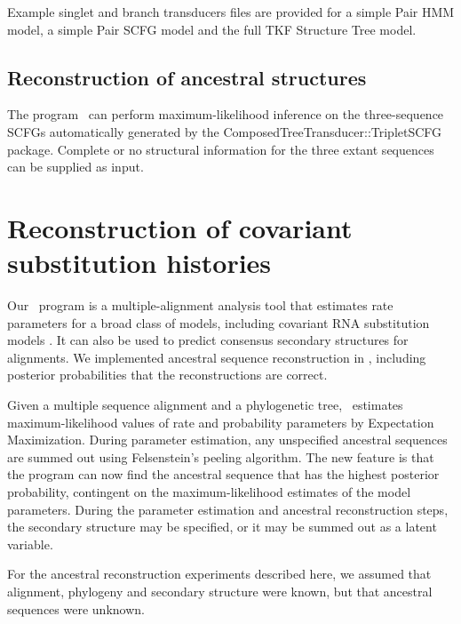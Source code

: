 \documentclass[10pt]{article}
\begin{document}
Example singlet and branch transducers files are provided for a simple 
Pair HMM model, a simple Pair SCFG model and the full TKF Structure Tree model.

\subsection{Reconstruction of ancestral structures}
The program \indiegram\ can perform maximum-likelihood inference on the
three-sequence SCFGs automatically generated by the ComposedTreeTransducer::TripletSCFG package.
Complete or no structural information for the three extant sequences can be supplied
as input.


\newpage
\section{Reconstruction of covariant substitution histories}

Our \xrate\ program is a multiple-alignment analysis tool
that estimates rate parameters for a broad class of models, including covariant RNA substitution models \cite{KlostermanEtAl2006}.
It can also be used to predict consensus secondary structures for alignments.
We implemented ancestral sequence reconstruction in \xrate, including posterior probabilities that the reconstructions are correct.

Given a multiple sequence alignment and a phylogenetic tree,
\xrate\ estimates maximum-likelihood values of rate and probability parameters by Expectation Maximization.
During parameter estimation, any unspecified ancestral sequences are summed out using Felsenstein's peeling algorithm.
The new feature is that the program can now find the ancestral sequence that has the highest posterior probability,
contingent on the maximum-likelihood estimates of the model parameters.
During the parameter estimation and ancestral reconstruction steps, the secondary structure may be specified, or it may be summed out as a latent variable.

For the ancestral reconstruction experiments described here,
we assumed that alignment, phylogeny and secondary structure were known,
but that ancestral sequences were unknown.
\end{document}
